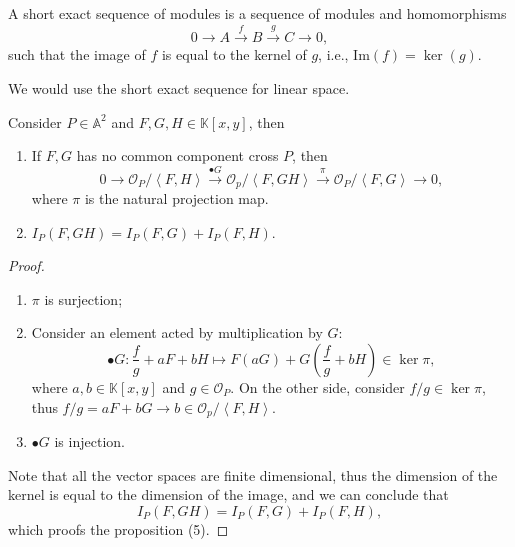 \documentclass[10pt]{article}
\begin{document}
\begin{definition}
  A short exact sequence of modules is a sequence of modules and homomorphisms
  \begin{equation*}
    0 \rightarrow A \xrightarrow{f} B \xrightarrow{g} C \rightarrow 0,
  \end{equation*}
  such that the image of $ f$ is equal to the kernel of $ g$, i.e., $ \mathrm{Im}(f) = \ker(g)$.
\end{definition}
We would use the short exact sequence for linear space.
\begin{definition}
  Consider $ P \in \mathbb{A}^{2}$ and $ F, G, H \in \mathbb{K}[x,y]$, then
  \begin{enumerate}[(1)]
    \item If $ F, G$ has no common component cross $ P$, then
      \begin{equation*}
        0 \rightarrow \mathcal{O}_{P}/\left< F,H \right> \xrightarrow{\bullet G} \mathcal{O}_{p}/\left< F, GH \right> \xrightarrow{\pi} \mathcal{O}_{P}/\left< F,G \right> \rightarrow 0,
      \end{equation*}
      where $ \pi$ is the natural projection map.
    \item $ I_{P}(F, GH) = I_{P}(F,G) + I_{P}(F,H)$.
  \end{enumerate}
\end{definition}
\begin{proof}
  \begin{enumerate}[(1)]
    \item $ \pi$ is surjection;
    \item Consider an element acted by multiplication by $ G$:
      \begin{equation*}
        \bullet G: \frac{f}{g} + a F + b H \mapsto F(a G) + G\left( \frac{f}{g} + b H \right) \in \ker{\pi},
      \end{equation*}
      where $ a, b \in \mathbb{K}[x,y]$ and $ g \in \mathcal{O}_{P}$. On the other side, consider $ f/g \in \ker{\pi}$, thus $ f / g = a F + b G \rightarrow b \in \mathcal{O}_{p} / \left< F,H \right>$.
    \item $\bullet G$ is injection.
  \end{enumerate}
  Note that all the vector spaces are finite dimensional, thus the dimension of the kernel is equal to the dimension of the image, and we can conclude that
  \begin{equation*}
    I_{P}(F, G H) = I_{P}(F,G) + I_{P}(F,H),
  \end{equation*}
  which proofs the proposition (5).
\end{proof}
\end{document}
